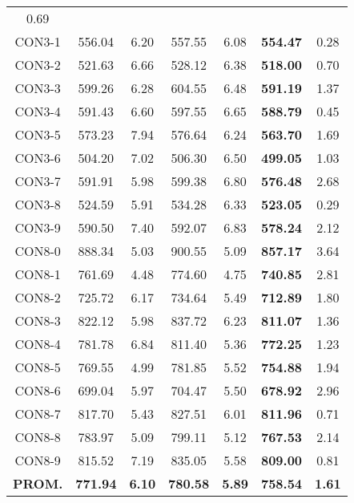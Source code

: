 \begin{table}[h]
\begin{tabular}{c c c c c c c}
0.69\\CON3-1 & 556.04 & 6.20 & 
557.55 & 6.08 & \bf{554.47} & 
0.28\\CON3-2 & 521.63 & 6.66 & 
528.12 & 6.38 & \bf{518.00} & 
0.70\\CON3-3 & 599.26 & 6.28 & 
604.55 & 6.48 & \bf{591.19} & 
1.37\\CON3-4 & 591.43 & 6.60 & 
597.55 & 6.65 & \bf{588.79} & 
0.45\\CON3-5 & 573.23 & 7.94 & 
576.64 & 6.24 & \bf{563.70} & 
1.69\\CON3-6 & 504.20 & 7.02 & 
506.30 & 6.50 & \bf{499.05} & 
1.03\\CON3-7 & 591.91 & 5.98 & 
599.38 & 6.80 & \bf{576.48} & 
2.68\\CON3-8 & 524.59 & 5.91 & 
534.28 & 6.33 & \bf{523.05} & 
0.29\\CON3-9 & 590.50 & 7.40 & 
592.07 & 6.83 & \bf{578.24} & 
2.12\\CON8-0 & 888.34 & 5.03 & 
900.55 & 5.09 & \bf{857.17} & 
3.64\\CON8-1 & 761.69 & 4.48 & 
774.60 & 4.75 & \bf{740.85} & 
2.81\\CON8-2 & 725.72 & 6.17 & 
734.64 & 5.49 & \bf{712.89} & 
1.80\\CON8-3 & 822.12 & 5.98 & 
837.72 & 6.23 & \bf{811.07} & 
1.36\\CON8-4 & 781.78 & 6.84 & 
811.40 & 5.36 & \bf{772.25} & 
1.23\\CON8-5 & 769.55 & 4.99 & 
781.85 & 5.52 & \bf{754.88} & 
1.94\\CON8-6 & 699.04 & 5.97 & 
704.47 & 5.50 & \bf{678.92} & 
2.96\\CON8-7 & 817.70 & 5.43 & 
827.51 & 6.01 & \bf{811.96} & 
0.71\\CON8-8 & 783.97 & 5.09 & 
799.11 & 5.12 & \bf{767.53} & 
2.14\\CON8-9 & 815.52 & 7.19 & 
835.05 & 5.58 & \bf{809.00} & 
0.81\\\bf{PROM.} & 
\bf{771.94} & \bf{6.10} & \bf{780.58} & \bf{5.89} & \bf{758.54} & \bf{1.61}\\[1ex]\hline
\end{tabular}
\label{table:ILS-VND-M-25-70}
\end{table}

